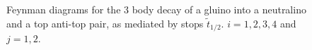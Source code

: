 \documentclass[final,3p,times,pdflatex]{elsarticle}
\begin{document}
\begin{figure}
  \caption{Feynman diagrams for the 3 body decay of a gluino into a
    neutralino and a top anti-top pair, as mediated by stops
    $\tilde{t}_{1/2}$. $i=1,2,3,4$ and $j=1,2$.} \label{gneutqqdiag}
\end{figure} 
\end{document}
